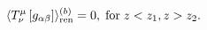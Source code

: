 \begin{equation}
\langle T_{\nu }^{\mu }\left[ g_{\alpha \beta }\right] \rangle _{{\rm ren}%
}^{(b)}=0,\;{\rm for}\;z< z_{1},z> z_{2}.  \label{bpartemt2}
\end{equation}

